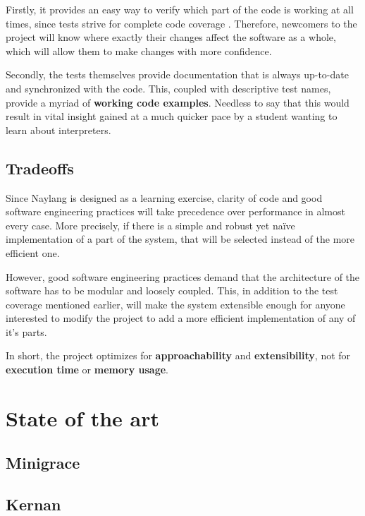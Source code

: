 Firstly, it provides an easy way to verify which part of the code is
working at all times, since tests strive for complete code coverage
\cite{needed}. Therefore, newcomers to the project will know where
exactly their changes affect the software as a whole, which will allow
them to make changes with more confidence.

Secondly, the tests themselves provide documentation that is always
up-to-date and synchronized with the code. This, coupled with
descriptive test names, provide a myriad of \textbf{working code
examples}. Needless to say that this would result in vital insight
gained at a much quicker pace by a student wanting to learn about
interpreters.

\section{Tradeoffs}\label{tradeoffs}

Since Naylang is designed as a learning exercise, clarity of code and
good software engineering practices will take precedence over
performance in almost every case. More precisely, if there is a simple
and robust yet naïve implementation of a part of the system, that will
be selected instead of the more efficient one.

However, good software engineering practices demand that the
architecture of the software has to be modular and loosely coupled.
This, in addition to the test coverage mentioned earlier, will make the
system extensible enough for anyone interested to modify the project to
add a more efficient implementation of any of it's parts.

In short, the project optimizes for \textbf{approachability} and
\textbf{extensibility}, not for \textbf{execution time} or
\textbf{memory usage}.

\chapter{State of the art}\label{state-of-the-art}

\section{Minigrace}\label{minigrace}

\section{Kernan}\label{kernan}

